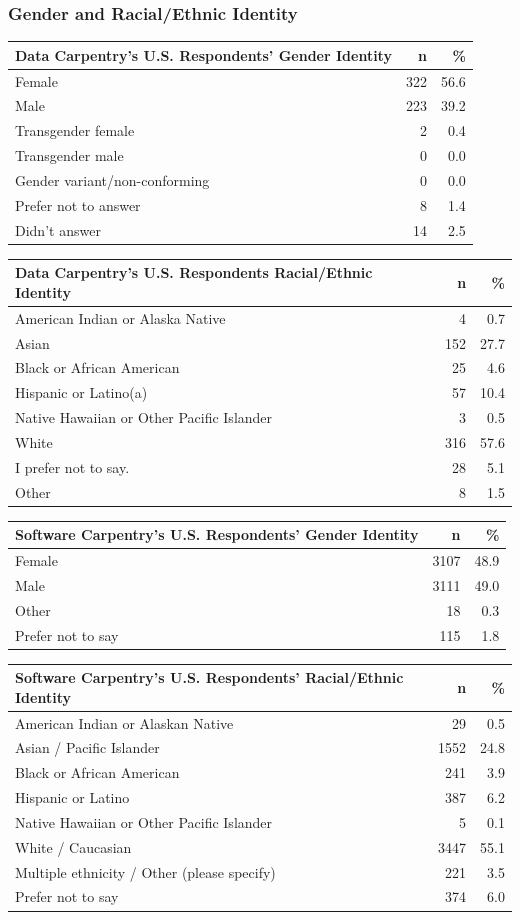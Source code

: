 \documentclass[]{article}
\begin{document}
\subsubsection{Gender and Racial/Ethnic
Identity}\label{gender-and-racialethnic-identity}

\begin{longtable}[]{@{}lrr@{}}
\toprule
Data Carpentry's U.S. Respondents' Gender Identity & n &
\%\tabularnewline
\midrule
\endhead
Female & 322 & 56.6\tabularnewline
Male & 223 & 39.2\tabularnewline
Transgender female & 2 & 0.4\tabularnewline
Transgender male & 0 & 0.0\tabularnewline
Gender variant/non-conforming & 0 & 0.0\tabularnewline
Prefer not to answer & 8 & 1.4\tabularnewline
Didn't answer & 14 & 2.5\tabularnewline
\bottomrule
\end{longtable}

\begin{longtable}[]{@{}lrr@{}}
\toprule
Data Carpentry's U.S. Respondents Racial/Ethnic Identity & n &
\%\tabularnewline
\midrule
\endhead
American Indian or Alaska Native & 4 & 0.7\tabularnewline
Asian & 152 & 27.7\tabularnewline
Black or African American & 25 & 4.6\tabularnewline
Hispanic or Latino(a) & 57 & 10.4\tabularnewline
Native Hawaiian or Other Pacific Islander & 3 & 0.5\tabularnewline
White & 316 & 57.6\tabularnewline
I prefer not to say. & 28 & 5.1\tabularnewline
Other & 8 & 1.5\tabularnewline
\bottomrule
\end{longtable}

\begin{longtable}[]{@{}lrr@{}}
\toprule
Software Carpentry's U.S. Respondents' Gender Identity & n &
\%\tabularnewline
\midrule
\endhead
Female & 3107 & 48.9\tabularnewline
Male & 3111 & 49.0\tabularnewline
Other & 18 & 0.3\tabularnewline
Prefer not to say & 115 & 1.8\tabularnewline
\bottomrule
\end{longtable}

\begin{longtable}[]{@{}lrr@{}}
\toprule
Software Carpentry's U.S. Respondents' Racial/Ethnic Identity & n &
\%\tabularnewline
\midrule
\endhead
American Indian or Alaskan Native & 29 & 0.5\tabularnewline
Asian / Pacific Islander & 1552 & 24.8\tabularnewline
Black or African American & 241 & 3.9\tabularnewline
Hispanic or Latino & 387 & 6.2\tabularnewline
Native Hawaiian or Other Pacific Islander & 5 & 0.1\tabularnewline
White / Caucasian & 3447 & 55.1\tabularnewline
Multiple ethnicity / Other (please specify) & 221 & 3.5\tabularnewline
Prefer not to say & 374 & 6.0\tabularnewline
\bottomrule
\end{longtable}
\end{document}
